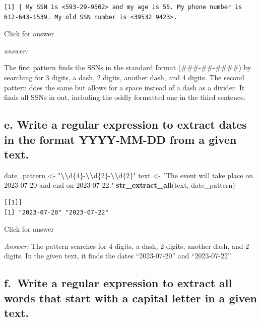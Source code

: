 \documentclass[
]{book}
\newenvironment{Shaded}{\begin{snugshade}}{\end{snugshade}}
\newcommand{\FunctionTok}[1]{\textcolor[rgb]{0.13,0.29,0.53}{\textbf{#1}}}
\newcommand{\NormalTok}[1]{#1}
\newcommand{\OtherTok}[1]{\textcolor[rgb]{0.56,0.35,0.01}{#1}}
\newcommand{\SpecialCharTok}[1]{\textcolor[rgb]{0.81,0.36,0.00}{\textbf{#1}}}
\newcommand{\StringTok}[1]{\textcolor[rgb]{0.31,0.60,0.02}{#1}}
\begin{document}
\begin{verbatim}
[1] | My SSN is <593-29-9502> and my age is 55. My phone number is 612-643-1539. My old SSN number is <39532 9423>.
\end{verbatim}

Click for answer

\emph{answer:}

The first pattern finds the SSNs in the standard format (\#\#\#-\#\#-\#\#\#\#) by searching for 3 digits, a dash, 2 digits, another dash, and 4 digits. The second pattern does the same but allows for a space instead of a dash as a divider. It finds all SSNs in out, including the oddly formatted one in the third sentence.

\hypertarget{e.-write-a-regular-expression-to-extract-dates-in-the-format-yyyy-mm-dd-from-a-given-text.}{%
\subsection{e. Write a regular expression to extract dates in the format YYYY-MM-DD from a given text.}\label{e.-write-a-regular-expression-to-extract-dates-in-the-format-yyyy-mm-dd-from-a-given-text.}}

\begin{Shaded}
\begin{Highlighting}[]
\NormalTok{date\_pattern }\OtherTok{\textless{}{-}} \StringTok{"}\SpecialCharTok{\textbackslash{}\textbackslash{}}\StringTok{d\{4\}{-}}\SpecialCharTok{\textbackslash{}\textbackslash{}}\StringTok{d\{2\}{-}}\SpecialCharTok{\textbackslash{}\textbackslash{}}\StringTok{d\{2\}"}
\NormalTok{text }\OtherTok{\textless{}{-}} \StringTok{"The event will take place on 2023{-}07{-}20 and end on 2023{-}07{-}22."}
\FunctionTok{str\_extract\_all}\NormalTok{(text, date\_pattern)}
\end{Highlighting}
\end{Shaded}

\begin{verbatim}
[[1]]
[1] "2023-07-20" "2023-07-22"
\end{verbatim}

Click for answer

\emph{Answer:} The pattern searches for 4 digits, a dash, 2 digits, another dash, and 2 digits. In the given text, it finds the dates ``2023-07-20'' and ``2023-07-22''.

\hypertarget{f.-write-a-regular-expression-to-extract-all-words-that-start-with-a-capital-letter-in-a-given-text.}{%
\subsection{f.~Write a regular expression to extract all words that start with a capital letter in a given text.}\label{f.-write-a-regular-expression-to-extract-all-words-that-start-with-a-capital-letter-in-a-given-text.}}
\end{document}

